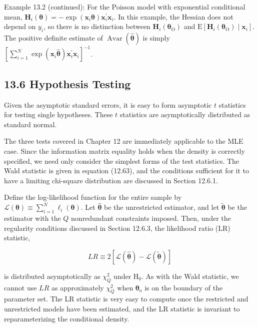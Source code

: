 \documentclass[10pt]{article}
\begin{document}
Example 13.2 (continued): For the Poisson model with exponential conditional mean, $\mathbf{H}_{i}(\boldsymbol{\theta})=-\exp \left(\mathbf{x}_{i} \boldsymbol{\theta}\right) \mathbf{x}_{i}^{\prime} \mathbf{x}_{i}$. In this example, the Hessian does not depend on $y_{i}$, so there is no distinction between $\mathbf{H}_{i}\left(\boldsymbol{\theta}_{\mathrm{O}}\right)$ and $\mathrm{E}\left[\mathbf{H}_{i}\left(\boldsymbol{\theta}_{\mathrm{O}}\right) \mid \mathbf{x}_{i}\right]$. The positive definite estimate of $\operatorname{Avar}(\hat{\boldsymbol{\theta}})$ is simply\\
$\left[\sum_{i=1}^{N} \exp \left(\mathbf{x}_{i} \hat{\boldsymbol{\theta}}\right) \mathbf{x}_{i}^{\prime} \mathbf{x}_{i}\right]^{-1}$.

\subsection*{13.6 Hypothesis Testing}
Given the asymptotic standard errors, it is easy to form asymptotic $t$ statistics for testing single hypotheses. These $t$ statistics are asymptotically distributed as standard normal.

The three tests covered in Chapter 12 are immediately applicable to the MLE case. Since the information matrix equality holds when the density is correctly specified, we need only consider the simplest forms of the test statistics. The Wald statistic is given in equation (12.63), and the conditions sufficient for it to have a limiting chi-square distribution are discussed in Section 12.6.1.

Define the log-likelihood function for the entire sample by $\mathscr{L}(\boldsymbol{\theta}) \equiv \sum_{i=1}^{N} \ell_{i}(\boldsymbol{\theta})$. Let $\hat{\boldsymbol{\theta}}$ be the unrestricted estimator, and let $\tilde{\boldsymbol{\theta}}$ be the estimator with the $Q$ nonredundant constraints imposed. Then, under the regularity conditions discussed in Section 12.6.3, the likelihood ratio (LR) statistic,


\begin{equation*}
L R \equiv 2[\mathscr{L}(\hat{\boldsymbol{\theta}})-\mathscr{L}(\tilde{\boldsymbol{\theta}})] \tag{13.35}
\end{equation*}


is distributed asymptotically as $\chi_{Q}^{2}$ under $\mathrm{H}_{0}$. As with the Wald statistic, we cannot use $L R$ as approximately $\chi_{Q}^{2}$ when $\boldsymbol{\theta}_{\mathrm{o}}$ is on the boundary of the parameter set. The LR statistic is very easy to compute once the restricted and unrestricted models have been estimated, and the LR statistic is invariant to reparameterizing the conditional density.
\end{document}
